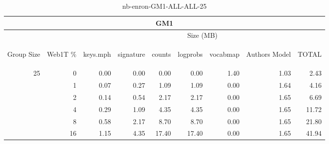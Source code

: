\begin{center}
\begin{table}[htbp] 
 \begin{center}
\begin{tabular}{ | r | r | r | r | r | r | r | r | r |}
\hline
\multicolumn{9}{|c|}{GM1}\\
\hline
 & & \multicolumn{7}{|c|}{Size (MB)}\\ \cline{3-9}
\begin{sideways}Group Size\end{sideways} & \begin{sideways}Web1T \% \end{sideways} & \begin{sideways}keys.mph\end{sideways} & \begin{sideways}signature\end{sideways} & \begin{sideways}counts\end{sideways} & \begin{sideways}logprobs\end{sideways} & \begin{sideways}vocabmap\end{sideways} & \begin{sideways}Authors Model \end{sideways} & \begin{sideways}TOTAL\end{sideways}\\
\hline
\multirow{5}{*}{25}
 & 0 & 0.00 & 0.00 & 0.00 & 0.00 & 1.40 & 1.03 & 2.43\\ \cline{2-9}
 & 1 & 0.07 & 0.27 & 1.09 & 1.09 & 0.00 & 1.64 & 4.16\\ \cline{2-9}
 & 2 & 0.14 & 0.54 & 2.17 & 2.17 & 0.00 & 1.65 & 6.69\\ \cline{2-9}
 & 4 & 0.29 & 1.09 & 4.35 & 4.35 & 0.00 & 1.65 & 11.72\\ \cline{2-9}
 & 8 & 0.58 & 2.17 & 8.70 & 8.70 & 0.00 & 1.65 & 21.80\\ \cline{2-9}
 & 16 & 1.15 & 4.35 & 17.40 & 17.40 & 0.00 & 1.65 & 41.94\\ \cline{2-9}
\hline
\end{tabular}
\caption{nb-enron-GM1-ALL-ALL-25}
\label{table:nb-enron-GM1-ALL-ALL-25}
\end{center}
 \end{table}
\end{center}

